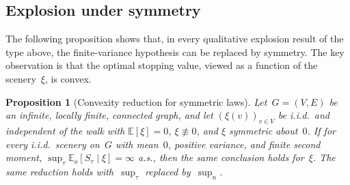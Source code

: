 \documentclass[11pt]{amsart}
\theoremstyle{plain}
\newtheorem{proposition}[theorem]{Proposition}
\theoremstyle{definition}
\newcommand{\E}{\mathbb{E}}
\begin{document}
	\subsection{Explosion under symmetry}
	
	The following proposition shows that, in every qualitative explosion result of the type above, the finite-variance hypothesis can be replaced by symmetry.  The key observation is that the optimal stopping value, viewed as a function of the scenery~$\xi$, is convex.
	
	\begin{proposition}[Convexity reduction for symmetric laws]\label{prop:convexity-reduction}
		Let~$G = (V,E)$ be an infinite, locally finite, connected graph, and let $(\xi(v))_{v\in V}$ be i.i.d.\ and independent of the walk with
		$\E[\xi]=0$, $\xi\not\equiv 0$, and $\xi$ symmetric about~$0$.
		If for every i.i.d.\ scenery on~$G$ with mean~$0$, positive variance, and finite second moment, $\sup_\tau\E_o[S_\tau\mid\xi]=\infty$ a.s., then the same conclusion holds for~$\xi$. The same reduction holds with~$\sup_\tau$ replaced by~$\sup_n$.
	\end{proposition}
	
\end{document}
